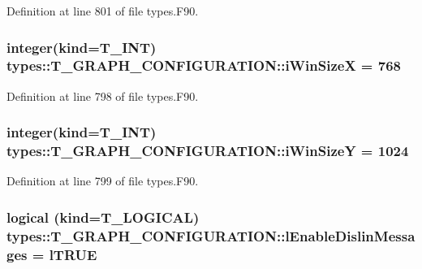 Definition at line 801 of file types.F90.

\hypertarget{typetypes_1_1_t___g_r_a_p_h___c_o_n_f_i_g_u_r_a_t_i_o_n_a96cd72fbb9eeb355e762f1bacabc6e4d}{
\subsubsection[{iWinSizeX}]{\setlength{\rightskip}{0pt plus 5cm}integer(kind={\bf T\_\-INT}) {\bf types::T\_\-GRAPH\_\-CONFIGURATION::iWinSizeX} = 768}}
\label{typetypes_1_1_t___g_r_a_p_h___c_o_n_f_i_g_u_r_a_t_i_o_n_a96cd72fbb9eeb355e762f1bacabc6e4d}


Definition at line 798 of file types.F90.

\hypertarget{typetypes_1_1_t___g_r_a_p_h___c_o_n_f_i_g_u_r_a_t_i_o_n_a21b5a384efd9f146880b27ef75bbb2ec}{
\subsubsection[{iWinSizeY}]{\setlength{\rightskip}{0pt plus 5cm}integer(kind={\bf T\_\-INT}) {\bf types::T\_\-GRAPH\_\-CONFIGURATION::iWinSizeY} = 1024}}
\label{typetypes_1_1_t___g_r_a_p_h___c_o_n_f_i_g_u_r_a_t_i_o_n_a21b5a384efd9f146880b27ef75bbb2ec}


Definition at line 799 of file types.F90.

\hypertarget{typetypes_1_1_t___g_r_a_p_h___c_o_n_f_i_g_u_r_a_t_i_o_n_a5deb2e076ef641e35f5f531d303cf81c}{
\subsubsection[{lEnableDislinMessages}]{\setlength{\rightskip}{0pt plus 5cm}logical (kind={\bf T\_\-LOGICAL}) {\bf types::T\_\-GRAPH\_\-CONFIGURATION::lEnableDislinMessages} = {\bf lTRUE}}}
\label{typetypes_1_1_t___g_r_a_p_h___c_o_n_f_i_g_u_r_a_t_i_o_n_a5deb2e076ef641e35f5f531d303cf81c}



